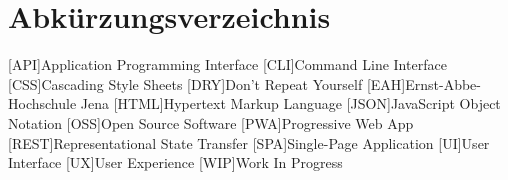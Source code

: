 \section*{Abkürzungsverzeichnis}
\begin{acronym}[xxxxxxx]\itemsep0pt
    [API]{Application Programming Interface}
    [CLI]{Command Line Interface}
    [CSS]{Cascading Style Sheets}
    [DRY]{Don’t Repeat Yourself}
    [EAH]{Ernst-Abbe-Hochschule Jena}
    [HTML]{Hypertext Markup Language}
    [JSON]{JavaScript Object Notation}
    [OSS]{Open Source Software}
    [PWA]{Progressive Web App}
    [REST]{Representational State Transfer}
    [SPA]{Single-Page Application}
    [UI]{User Interface}
    [UX]{User Experience}
    [WIP]{Work In Progress}
\end{acronym}
